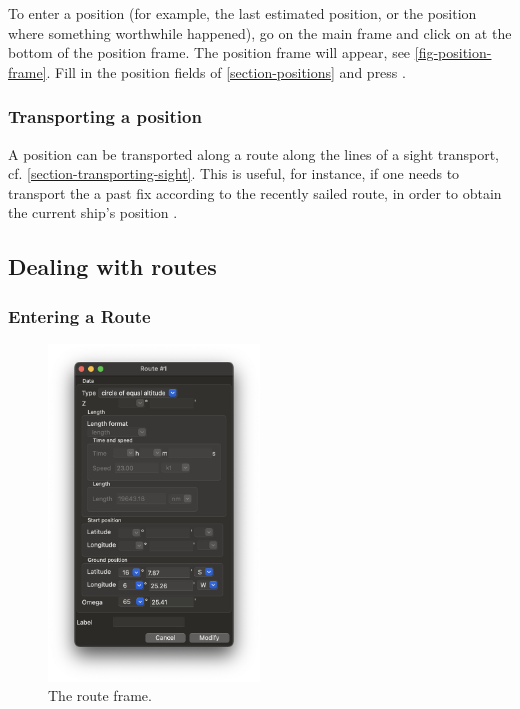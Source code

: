 \documentclass{ol-softwaremanual}
\begin{document}
To enter a position  (for example, the last estimated position, or the position where something worthwhile happened), go on the main frame and click on  at the bottom of the position frame. The position frame will appear, see \cref{fig-position-frame}. Fill in the position fields of \cref{section-positions} and press . 

\subsubsection{Transporting a position}\label{section-transport-position}

A position can be transported along a route along the lines of a sight transport, cf. \cref{section-transporting-sight}. This is useful, for instance, if one needs to transport the a past fix according to the recently sailed route, in order to obtain the current ship's position \cite{bowditch2002the}. 


\subsection{Dealing with routes}\label{section-routes}


\subsubsection{Entering a Route}\label{section-entering-route}

\begin{figure}
  \centering
  \includegraphics[width=0.5\textwidth]{figures/route-frame.png}
  \caption{
    \label{fig-route-frame}
    The route frame.  
  }
\end{figure}
\end{document}
